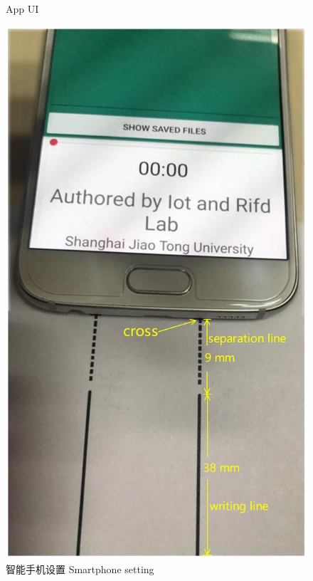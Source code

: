 \begin{figure}[!htp]
\begin{minipage}[t]{0.32\textwidth}
      {App UI}
        \label{fig:app-ui}
  \end{minipage}
  \centering
  \begin{minipage}[t]{0.32\textwidth}
    \centering
    \includegraphics[width=\textwidth]{figure/app-smartphone-setting.pdf}
    \bicaption
    {智能手机设置}
    {Smartphone setting}
    \label{fig:smartphone-setting}
   \end{minipage}
   \begin{minipage}[t]{0.32\textwidth}

\end{minipage}
\end{figure}

